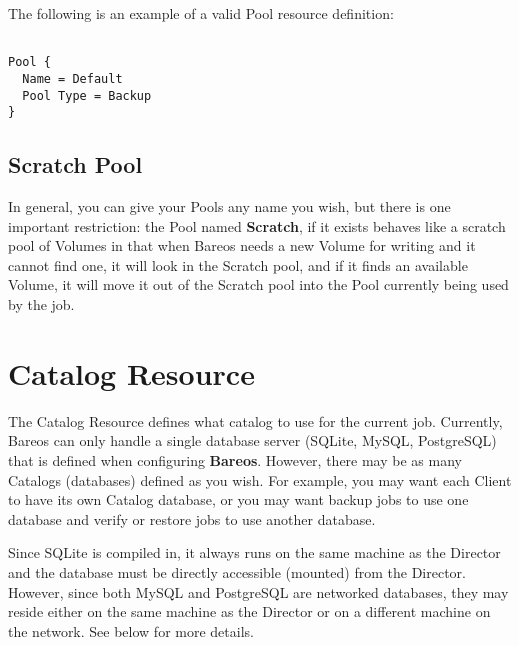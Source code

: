 The following is an example of a valid Pool resource definition:

\footnotesize
\begin{verbatim}

Pool {
  Name = Default
  Pool Type = Backup
}
\end{verbatim}
\normalsize

\subsection{Scratch Pool}
\label{TheScratchPool}

In general, you can give your Pools any name you wish, but there is one
important restriction: the Pool named {\bf Scratch}, if it exists behaves
like a scratch pool of Volumes in that when Bareos needs a new Volume for
writing and it cannot find one, it will look in the Scratch pool, and if
it finds an available Volume, it will move it out of the Scratch pool into
the Pool currently being used by the job.

\section{Catalog Resource}
\label{CatalogResource}

The Catalog Resource defines what catalog to use for the current job.
Currently, Bareos can only handle a single database server (SQLite, MySQL,
PostgreSQL) that is defined when configuring {\bf Bareos}.  However, there
may be as many Catalogs (databases) defined as you wish.  For example, you
may want each Client to have its own Catalog database, or you may want
backup jobs to use one database and verify or restore jobs to use another
database.

Since SQLite is compiled in, it always runs on the same machine
as the Director and the database must be directly accessible (mounted) from
the Director.  However, since both MySQL and PostgreSQL are networked
databases, they may reside either on the same machine as the Director
or on a different machine on the network.  See below for more details.


